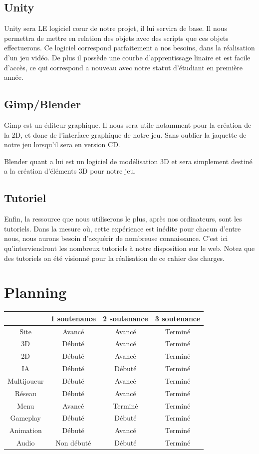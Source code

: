 \documentclass[a4paper, 12pt]{article}
\begin{document}
	\subsection{Unity}
	Unity sera LE logiciel cœur de notre projet, il lui servira de base. Il nous permettra de mettre en relation des objets avec des scripts que ces objets effectuerons. Ce logiciel correspond parfaitement a nos besoins, dans la réalisation d'un jeu vidéo. De plus il possède une courbe d'apprentissage linaire et est facile d'accès, ce qui correspond a nouveau avec notre statut d'étudiant en première année.
	\subsection{Gimp/Blender}
	Gimp est un éditeur graphique. Il nous sera utile notamment pour la création de la 2D, et donc de l'interface graphique de notre jeu. Sans oublier la jaquette de notre jeu lorsqu'il sera en version CD.
	\par Blender quant a lui est un logiciel de modélisation 3D et sera simplement destiné a la création d'éléments 3D pour notre jeu. 
	\subsection{Tutoriel}
	Enfin, la ressource que nous utiliserons le plus, après nos ordinateurs, sont les tutoriels. Dans la mesure où, cette expérience est inédite pour chacun d'entre nous, nous aurons besoin d'acquérir de nombreuse connaissance. C'est ici qu'interviendront les nombreux tutoriels à notre disposition sur le web. Notez que des tutoriels on été visionné pour la réalisation de ce cahier des charges.
\section{Planning}
	\begin{tabular}{|c||c|c|c|}
		\hline
		& 1\iere{} soutenance & 2\ieme{} soutenance & 3\ieme{} soutenance \\
		\hline
		Site &  Avancé & Avancé & Terminé \\
		\hline
		3D & Débuté & Avancé & Terminé \\
		\hline
		2D & Débuté & Avancé & Terminé \\
		\hline
		IA & Débuté & Débuté & Terminé\\
		\hline
		Multijoueur & Débuté & Avancé & Terminé\\
		\hline
		Réseau & Débuté & Avancé & Terminé\\
		\hline
		Menu & Avancé & Terminé & Terminé \\
		\hline
		Gameplay & Débuté & Débuté & Terminé\\
		\hline
		Animation & Débuté & Avancé & Terminé\\		
		\hline
		Audio & Non débuté & Débuté & Terminé\\
		\hline		
	\end{tabular}\\
	\newpage
\end{document}
